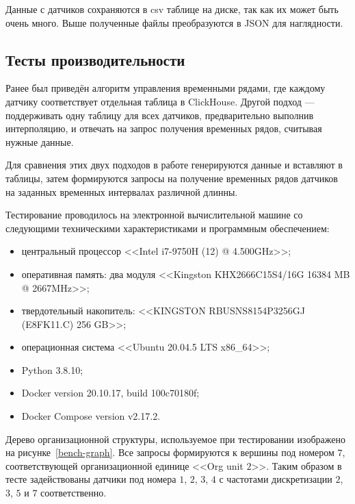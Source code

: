 Данные с датчиков сохраняются в csv таблице на диске, так как их может быть очень много. Выше полученные файлы преобразуются в JSON для наглядности.

\subsection{Тесты производительности}

Ранее был приведён алгоритм управления временными рядами, где каждому датчику соответствует отдельная таблица в ClickHouse. Другой подход --- поддерживать одну таблицу для всех датчиков, предварительно выполнив интерполяцию, и отвечать на запрос получения временных рядов, считывая нужные данные.

Для сравнения этих двух подходов в работе генерируются данные и вставляют в таблицы, затем формируются запросы на получение временных рядов датчиков на заданных временных интервалах различной длинны.

Тестирование проводилось на электронной вычислительной машине со следующими техническими характеристиками и программным обеспечением:

\begin{itemize}
    \item центральный процессор <<Intel i7-9750H (12) @ 4.500GHz>>;
    \item оперативная память: два модуля <<Kingston KHX2666C15S4/16G 16384 MB @ 2667MHz>>;
    \item твердотельный накопитель: <<KINGSTON RBUSNS8154P3256GJ (E8FK11.C) 256 GB>>;
    \item операционная система <<Ubuntu 20.04.5 LTS x86\_64>>;
    \item Python 3.8.10;
    \item Docker version 20.10.17, build 100c70180f;
    \item Docker Compose version v2.17.2.
\end{itemize}

Дерево организационной структуры, используемое при тестировании изображено на рисунке~\ref{bench-graph}. Все запросы формируются к вершины под номером $7$, соответствующей организационной единице <<Org unit $2$>>. Таким образом в тесте задействованы датчики под номера $1$, $2$, $3$, $4$ с частотами дискретизации $2$, $3$, $5$ и $7$ соответственно.

